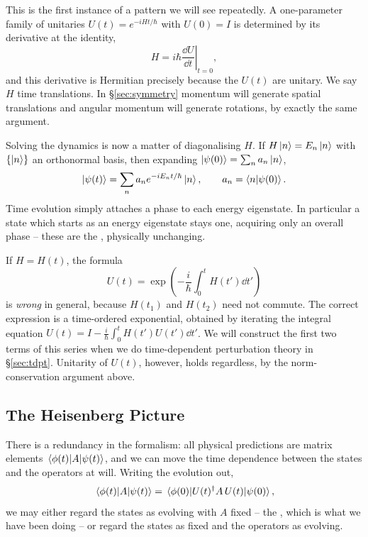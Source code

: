 \documentclass[a4paper]{scrartcl}
\begin{document}
This is the first instance of a pattern we will see repeatedly. A one-parameter family of unitaries $U(t) = e^{-iHt/\hbar}$ with $U(0) = I$ is determined by its derivative at the identity,
$$
H = i \hbar \left.\frac{\dd U}{\dd t}\right|_{t=0},
$$
and this derivative is Hermitian precisely because the $U(t)$ are unitary. We say $H$  time translations. In \S\ref{sec:symmetry} momentum will generate spatial translations and angular momentum will generate rotations, by exactly the same argument.

Solving the dynamics is now a matter of diagonalising $H$. If $H\ket{n} = E_n\ket{n}$ with $\{\ket{n}\}$ an orthonormal basis, then expanding $\ket{\psi(0)} = \sum_n a_n \ket{n}$,
$$
\ket{\psi(t)} = \sum_n a_n e^{-iE_n t/\hbar}\ket{n}, \qquad a_n = \braket{n}{\psi(0)}.
$$
Time evolution simply attaches a phase to each energy eigenstate. In particular a state which starts as an energy eigenstate stays one, acquiring only an overall phase -- these are the , physically unchanging.

\begin{remark}
    If $H = H(t)$, the formula
    $$
    U(t) = \exp\left(-\frac{i}{\hbar}\int_0^t H(t')\dd t'\right)
    $$
    is \emph{wrong} in general, because $H(t_1)$ and $H(t_2)$ need not commute. The correct expression is a time-ordered exponential, obtained by iterating the integral equation $U(t) = I - \frac{i}{\hbar}\int_0^t H(t')U(t')\dd t'$. We will construct the first two terms of this series when we do time-dependent perturbation theory in \S\ref{sec:tdpt}. Unitarity of $U(t)$, however, holds regardless, by the norm-conservation argument above.
\end{remark}

\subsection{The Heisenberg Picture}

There is a redundancy in the formalism: all physical predictions are matrix elements $\mel{\phi(t)}{A}{\psi(t)}$, and we can move the time dependence between the states and the operators at will. Writing the evolution out,
$$
\mel{\phi(t)}{A}{\psi(t)} = \mel{\phi(0)}{U(t)^\dagger A \, U(t)}{\psi(0)},
$$
we may either regard the states as evolving with $A$ fixed -- the , which is what we have been doing -- or regard the states as fixed and the operators as evolving.
\end{document}

